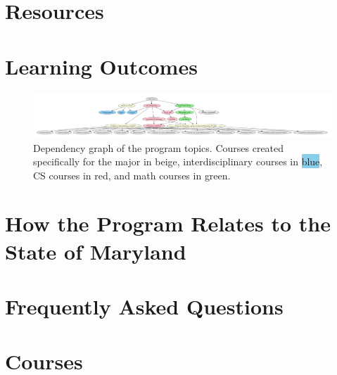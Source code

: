 \documentclass[
10pt, %
a4paper, %
oneside, %
headinclude,footinclude, %
BCOR5mm, %
]{scrartcl}
\begin{document}


\section{Resources}




\section{Learning Outcomes}


\begin{figure}

  \includegraphics[width=1.2\linewidth]{dependency_graph/all}
  \caption{Dependency graph of the program topics.  Courses created specifically for the \ai{} major in \colorbox{yellow!30}{beige}, interdisciplinary courses in \colorbox{SkyBlue}{blue}, CS courses in \colorbox{red!30}{red}, and math courses in \colorbox{green!30}{green}.}
\end{figure}





\section{How the Program Relates to the State of Maryland}



\section{Frequently Asked Questions}



  \section{Courses}
\end{document}
